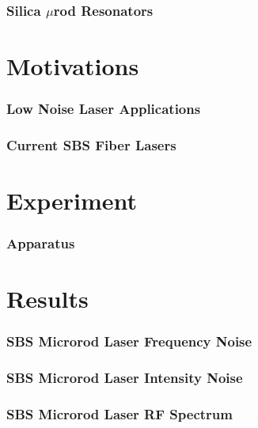 \documentclass{beamer}
\begin{document}
\begin{frame}\frametitle{Silica $\mu$rod Resonators}

\end{frame}

\section{Motivations}
\begin{frame}\frametitle{Low Noise Laser Applications}
\end{frame}

\begin{frame}\frametitle{Current SBS Fiber Lasers}
\end{frame}


\section{Experiment}
\begin{frame}\frametitle{Apparatus}
\end{frame}

\section{Results}
\begin{frame}\frametitle{SBS Microrod Laser Frequency Noise}
\end{frame}

\begin{frame}\frametitle{SBS Microrod Laser Intensity Noise}
\end{frame}

\begin{frame}\frametitle{SBS Microrod Laser RF Spectrum}
\end{frame}
\end{document}
